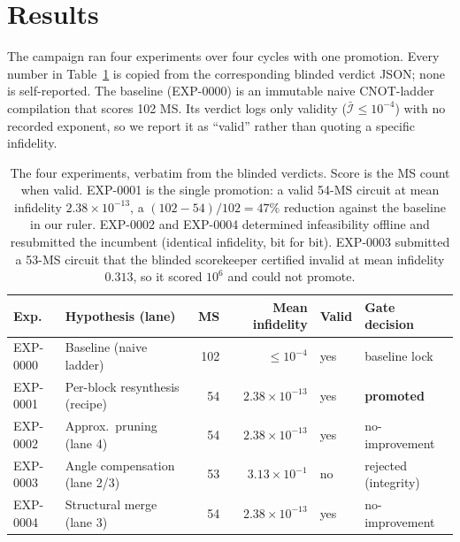 \documentclass[11pt]{article}
\begin{document}
\section{Results}
\label{sec:results}

The campaign ran four experiments over four cycles with one promotion. Every number
in Table~\ref{tab:results} is copied from the corresponding blinded verdict JSON;
none is self-reported. The baseline (EXP-0000) is an immutable naive CNOT-ladder
compilation that scores 102 MS. Its verdict logs only validity
($\bar{\mathcal{I}} \le 10^{-4}$) with no recorded exponent, so we report it as
``valid'' rather than quoting a specific infidelity.

\begin{table}[t]
\centering
\small
\begin{tabular}{@{}llrrll@{}}
\toprule
Exp. & Hypothesis (lane) & MS & Mean infidelity & Valid & Gate decision \\
\midrule
EXP-0000 & Baseline (naive ladder)        & 102 & $\le 10^{-4}$           & yes & baseline lock \\
EXP-0001 & Per-block resynthesis (recipe) & 54  & $2.38\times10^{-13}$    & yes & \textbf{promoted} \\
EXP-0002 & Approx.\ pruning (lane 4)      & 54  & $2.38\times10^{-13}$    & yes & no-improvement \\
EXP-0003 & Angle compensation (lane 2/3)  & 53  & $3.13\times10^{-1}$     & no  & rejected (integrity) \\
EXP-0004 & Structural merge (lane 3)      & 54  & $2.38\times10^{-13}$    & yes & no-improvement \\
\bottomrule
\end{tabular}
\caption{The four experiments, verbatim from the blinded verdicts. Score is the MS
count when valid. EXP-0001 is the single promotion: a valid 54-MS circuit at mean
infidelity $2.38\times10^{-13}$, a $(102-54)/102 = 47\%$ reduction against the
baseline in our ruler. EXP-0002 and EXP-0004 determined infeasibility offline and
resubmitted the incumbent (identical infidelity, bit for bit). EXP-0003 submitted a
53-MS circuit that the blinded scorekeeper certified invalid at mean infidelity
$0.313$, so it scored $10^{6}$ and could not promote.}
\label{tab:results}
\end{table}
\end{document}
